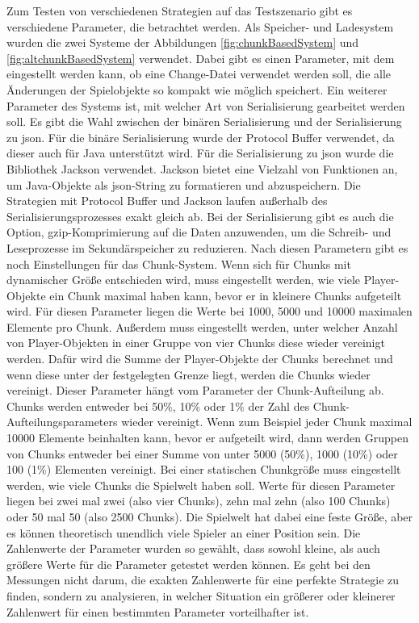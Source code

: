 Zum Testen von verschiedenen Strategien auf das Testszenario gibt es verschiedene Parameter, die betrachtet werden. Als Speicher- und Ladesystem wurden die zwei Systeme der Abbildungen \ref{fig:chunkBasedSystem} und \ref{fig:altchunkBasedSystem} verwendet. Dabei gibt es einen Parameter, mit dem eingestellt werden kann, ob eine Change-Datei verwendet werden soll, die alle Änderungen der Spielobjekte so kompakt wie möglich speichert. Ein weiterer Parameter des Systems ist, mit welcher Art von Serialisierung gearbeitet werden soll. Es gibt die Wahl zwischen der binären Serialisierung und der Serialisierung zu \ac{json}. Für die binäre Serialisierung wurde der Protocol Buffer verwendet, da dieser auch für Java unterstützt wird. Für die Serialisierung zu \ac{json} wurde die Bibliothek Jackson verwendet. Jackson bietet eine Vielzahl von Funktionen an, um Java-Objekte als \ac{json}-String zu formatieren und abzuspeichern.\cite{githubGitHubFasterXMLjackson} Die Strategien mit Protocol Buffer und Jackson laufen außerhalb des Serialisierungsprozesses exakt gleich ab. Bei der Serialisierung gibt es auch die Option, \ac{gzip}-Komprimierung auf die Daten anzuwenden, um die Schreib- und Leseprozesse im Sekundärspeicher zu reduzieren. Nach diesen Parametern gibt es noch Einstellungen für das Chunk-System. Wenn sich für Chunks mit dynamischer Größe entschieden wird, muss eingestellt werden, wie viele Player-Objekte ein Chunk maximal haben kann, bevor er in kleinere Chunks aufgeteilt wird. Für diesen Parameter liegen die Werte bei 1000, 5000 und 10000 maximalen Elemente pro Chunk. Außerdem muss eingestellt werden, unter welcher Anzahl von Player-Objekten in einer Gruppe von vier Chunks diese wieder vereinigt werden. Dafür wird die Summe der Player-Objekte der Chunks berechnet und wenn diese unter der festgelegten Grenze liegt, werden die Chunks wieder vereinigt. Dieser Parameter hängt vom Parameter der Chunk-Aufteilung ab. Chunks werden entweder bei 50\%, 10\% oder 1\% der Zahl des Chunk-Aufteilungsparameters wieder vereinigt. Wenn zum Beispiel jeder Chunk maximal 10000 Elemente beinhalten kann, bevor er aufgeteilt wird, dann werden Gruppen von Chunks entweder bei einer Summe von unter 5000 (50\%), 1000 (10\%) oder 100 (1\%) Elementen vereinigt. Bei einer statischen Chunkgröße muss eingestellt werden, wie viele Chunks die Spielwelt haben soll. Werte für diesen Parameter liegen bei zwei mal zwei (also vier Chunks), zehn mal zehn (also 100 Chunks) oder 50 mal 50 (also 2500 Chunks). Die Spielwelt hat dabei eine feste Größe, aber es können theoretisch unendlich viele Spieler an einer Position sein. Die Zahlenwerte der Parameter wurden so gewählt, dass sowohl kleine, als auch größere Werte für die Parameter getestet werden können. Es geht bei den Messungen nicht darum, die exakten Zahlenwerte für eine perfekte Strategie zu finden, sondern zu analysieren, in welcher Situation ein größerer oder kleinerer Zahlenwert für einen bestimmten Parameter vorteilhafter ist. 

